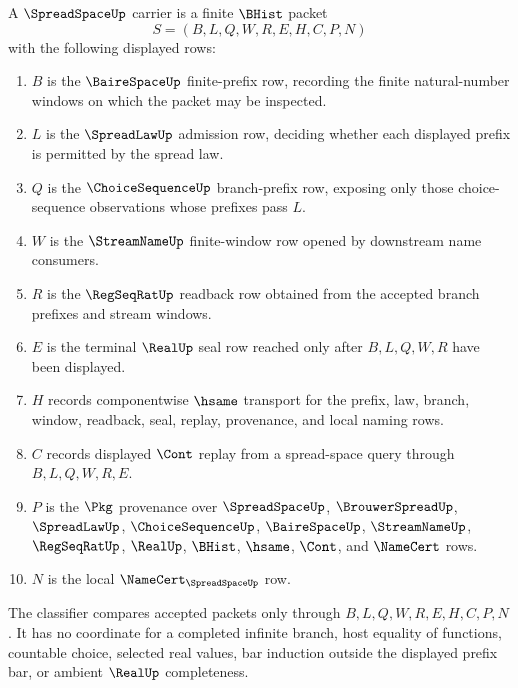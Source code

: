 \begin{definition}
\label{def:spreadspace-carrier}
A $\SpreadSpaceUp$ carrier is a finite $\BHist$ packet
$$
S=(B,L,Q,W,R,E,H,C,P,N)
$$
with the following displayed rows:
\begin{enumerate}
\item $B$ is the $\BaireSpaceUp$ finite-prefix row, recording the finite natural-number windows on which the packet may be inspected.
\item $L$ is the $\SpreadLawUp$ admission row, deciding whether each displayed prefix is permitted by the spread law.
\item $Q$ is the $\ChoiceSequenceUp$ branch-prefix row, exposing only those choice-sequence observations whose prefixes pass $L$.
\item $W$ is the $\StreamNameUp$ finite-window row opened by downstream name consumers.
\item $R$ is the $\RegSeqRatUp$ readback row obtained from the accepted branch prefixes and stream windows.
\item $E$ is the terminal $\RealUp$ seal row reached only after $B,L,Q,W,R$ have been displayed.
\item $H$ records componentwise $\hsame$ transport for the prefix, law, branch, window, readback, seal, replay, provenance, and local naming rows.
\item $C$ records displayed $\Cont$ replay from a spread-space query through $B,L,Q,W,R,E$.
\item $P$ is the $\Pkg$ provenance over $\SpreadSpaceUp$, $\BrouwerSpreadUp$, $\SpreadLawUp$, $\ChoiceSequenceUp$, $\BaireSpaceUp$, $\StreamNameUp$, $\RegSeqRatUp$, $\RealUp$, $\BHist$, $\hsame$, $\Cont$, and $\NameCert$ rows.
\item $N$ is the local $\NameCert_{\SpreadSpaceUp}$ row.
\end{enumerate}
The classifier compares accepted packets only through $B,L,Q,W,R,E,H,C,P,N$. It has no coordinate for a completed infinite branch, host equality of functions, countable choice, selected real values, bar induction outside the displayed prefix bar, or ambient $\RealUp$ completeness.
\end{definition}

